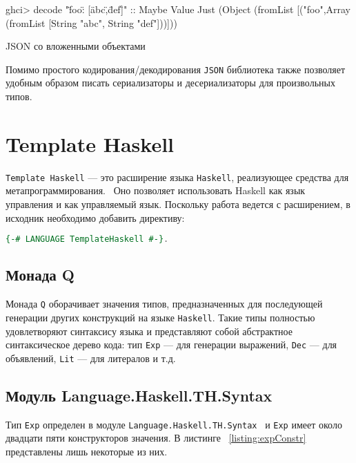 \begin{ListingEnv}[H]
\begin{Verb}
ghci> decode "{\"foo\": [\"abc\",\"def\"]}" :: Maybe Value
Just (Object (fromList [("foo",Array (fromList [String "abc", 
                                               String "def"]))]))
\end{Verb}
\caption{JSON со вложенными объектами}
\label{listing:astGetComp}
\end{ListingEnv}

Помимо простого кодирования/декодирования \lstinline{JSON} библиотека также позволяет удобным образом писать сериализаторы и десериализаторы для произвольных типов.

\section{Template Haskell}

\lstinline{Template Haskell} --- это расширение языка \lstinline{Haskell}, реализующее средства для метапрограммирования.~\cite{extensionHub} Оно позволяет использовать Haskell как язык управления и как управляемый язык. Поскольку работа ведется с расширением, в исходник необходимо добавить директиву:

\begin{lstlisting}[language=Haskell]
{-# LANGUAGE TemplateHaskell #-}.
\end{lstlisting}

\subsection{Монада Q}

Монада \lstinline{Q} оборачивает значения типов, предназначенных для последующей генерации других конструкций на языке \lstinline{Haskell}. Такие типы полностью удовлетворяют синтаксису языка и представляют собой абстрактное синтаксическое дерево кода: тип \lstinline{Exp} --- для генерации выражений, \lstinline{Dec} --- для объявлений, \lstinline{Lit} --- для литералов и т.д.~\cite{thSyntax}

\subsection{Модуль Language.Haskell.TH.Syntax}

Тип \lstinline{Exp} определен в модуле \lstinline{Language.Haskell.TH.Syntax}~\cite{coverHaskell} и  \lstinline{Exp} имеет около двадцати пяти конструкторов значения. В листинге ~\ref{listing:expConstr} представлены лишь некоторые из них.  

